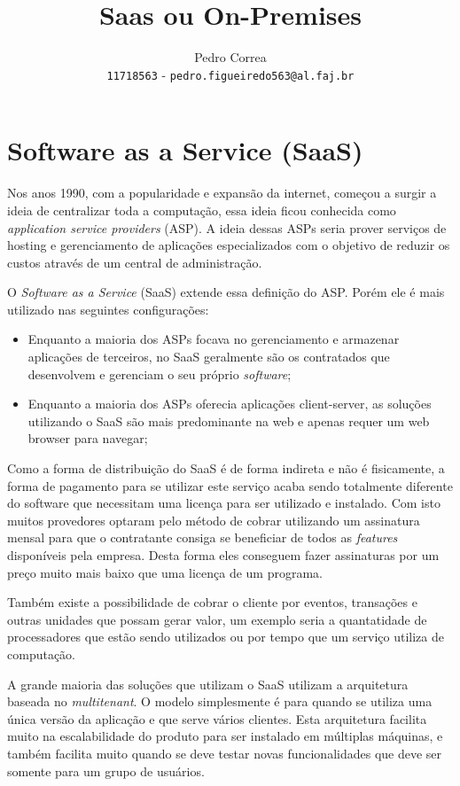\documentclass[a4paper, 12pt]{article}
\author{
  Pedro Correa\\
  \texttt{11718563} - \texttt{pedro.figueiredo563@al.faj.br}
}
\title{Saas ou On-Premises}
\begin{document}
\maketitle

\newpage

\section{Software as a Service (SaaS)}

Nos anos 1990, com a popularidade e expansão da internet, começou a surgir a ideia de centralizar toda a computação, essa ideia ficou conhecida como \emph{application service providers} (ASP).
A ideia dessas ASPs seria prover serviços de hosting e gerenciamento de aplicações especializados com o objetivo de reduzir os custos através de um central de administração.

O \emph{Software as a Service} (SaaS) extende essa definição do ASP. Porém ele é mais utilizado nas seguintes configurações:

\begin{itemize}
  \item Enquanto a maioria dos ASPs focava no gerenciamento e armazenar aplicações de terceiros, no SaaS geralmente são os contratados que desenvolvem e gerenciam o seu próprio \emph{software};
  \item Enquanto a maioria dos ASPs oferecia aplicações client-server, as soluções utilizando o SaaS são mais predominante na web e apenas requer um web browser para navegar;
\end{itemize}

Como a forma de distribuição do SaaS é de forma indireta e não é fisicamente,
a forma de pagamento para se utilizar este serviço acaba sendo totalmente diferente do software que necessitam uma licença para ser utilizado e instalado.
Com isto muitos provedores optaram pelo método de cobrar utilizando um assinatura mensal para que o contratante consiga se beneficiar de todos as \emph{features} disponíveis pela empresa.
Desta forma eles conseguem fazer assinaturas por um preço muito mais baixo que uma licença de um programa.

Também existe a possibilidade de cobrar o cliente por eventos,
transações e outras unidades que possam gerar valor,
um exemplo seria a quantatidade de processadores que estão sendo utilizados ou por tempo que um serviço utiliza de computação.

A grande maioria das soluções que utilizam o SaaS utilizam a arquitetura baseada no \emph{multitenant}.
O modelo simplesmente é para quando se utiliza uma única versão da aplicação e que serve vários clientes.
Esta arquitetura facilita muito na escalabilidade do produto para ser instalado em múltiplas máquinas,
e também facilita muito quando se deve testar novas funcionalidades que deve ser somente para um grupo de usuários.
\end{document}
